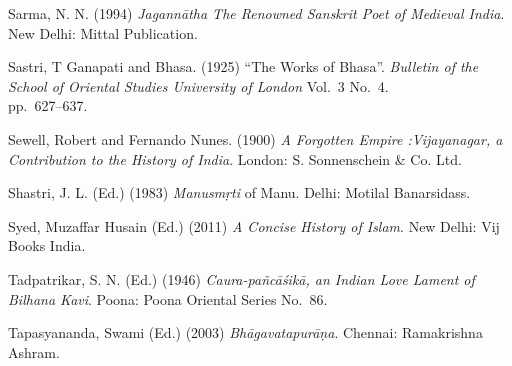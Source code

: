 \begin{thebibliography}{99}
Sarma, N. N. (1994) {\sl Jagannātha The Renowned Sanskrit Poet of Medieval India}. New Delhi: Mittal Publication.

Sastri, T Ganapati and Bhasa. (1925) “The Works of Bhasa”. {\sl Bulletin of the School of Oriental Studies University of London} Vol.~3 No.~4.\\ pp.~627--637.

Sewell, Robert and Fernando Nunes. (1900) {\sl A Forgotten Empire :Vijayanagar, a Contribution to the History of India}. London: S. Sonnenschein \& Co. Ltd.

Shastri, J. L. (Ed.) (1983) {\sl Manusmṛti} of Manu. Delhi: Motilal Banarsidass.

Syed, Muzaffar Husain (Ed.) (2011) {\sl A Concise History of Islam}. New Delhi: Vij Books India. 

Tadpatrikar, S. N. (Ed.) (1946) {\sl Caura-pañcāśikā, an Indian Love Lament of Bilhana Kavi}. Poona: Poona Oriental Series No.~86.

Tapasyananda, Swami (Ed.) (2003) {\sl Bhāgavatapurāṇa}. Chennai: Ramakrishna Ashram.

\end{thebibliography}

\theendnotes
